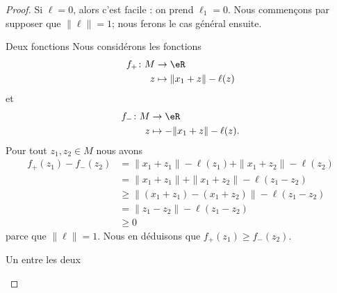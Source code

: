 \begin{proof}
    Si \( \ell=0\), alors c'est facile : on prend \( \ell_1=0\). Nous commençons par supposer que \( \| \ell \|=1\); nous ferons le cas général ensuite.
    \begin{subproof}
        \item[Deux fonctions]
            Nous considérons les fonctions
            \begin{equation}
                \begin{aligned}
                    f_+\colon M&\to \eR \\
                    z&\mapsto \| x_1+z \|-\ell(z) 
                \end{aligned}
            \end{equation}
            et
            \begin{equation}
                \begin{aligned}
                    f_-\colon M&\to \eR \\
                    z&\mapsto -\| x_1+z \|-\ell(z). 
                \end{aligned}
            \end{equation}
            Pour tout \( z_1,z_2\in M\) nous avons
            \begin{subequations}
                \begin{align}
                    f_+(z_1)-f_-(z_2)&=\| x_1+z_1 \|-\ell(z_1)+\| x_1+z_2 \|-\ell(z_2)\\
                    &=\| x_1+z_1 \|+\| x_1+z_2 \|-\ell(z_1-z_2)\\
                    &\geq \| (x_1+z_1)-(x_1+z_2) \|-\ell(z_1-z_2)\\
                    &=\| z_1-z_2  \|-\ell(z_1-z_2)\\
                    &\geq 0
                \end{align}
            \end{subequations}
            parce que \( \| \ell \|=1\). Nous en déduisons que \( f_+(z_1)\geq f_-(z_2)\).

        \item[Un entre les deux]


\end{subproof}
\end{proof}
